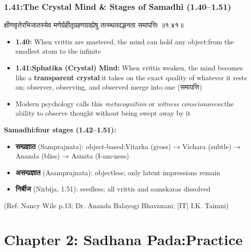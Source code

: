 \begin{frame}[fragile]\frametitle{1.41:The Crystal Mind \& Stages of Samadhi (1.40–1.51)}

\begin{sanskrit}
क्षीणवृत्तेरभिजातस्येव मणेर्ग्रहीतृग्रहणग्राह्येषु तत्स्थतदञ्जनता समापत्तिः ॥१.४१॥
\end{sanskrit}

\begin{itemize}
\item \textbf{1.40:} When vrittis are mastered, the mind can hold any object:from the smallest atom to the infinite
\item \textbf{1.41:Sphatika (Crystal) Mind:} When vrittis weaken, the mind becomes like a \textbf{transparent crystal}:it takes on the exact quality of whatever it rests on; observer, observing, and observed merge into one (समापत्ति)
\item Modern psychology calls this \emph{metacognition} or \emph{witness consciousness}:the ability to observe thought without being swept away by it
\end{itemize}

\textbf{Samadhi:four stages (1.42–1.51):}
\begin{itemize}
\item \textbf{सम्प्रज्ञात} (Samprajnata): object-based:Vitarka (gross) → Vichara (subtle) → Ananda (bliss) → Asmita (I-am-ness)
\item \textbf{असम्प्रज्ञात} (Asamprajnata): objectless; only latent impressions remain
\item \textbf{निर्बीज} (Nirbija, 1.51): seedless; all vrittis and samskaras dissolved
\end{itemize}

\tiny{(Ref: Nancy Wile p.13; Dr. Ananda Balayogi Bhavanani; [IT] I.K. Taimni)}

\end{frame}

\section[Sadhanapad]{Chapter 2: Sadhana Pada:Practice}

